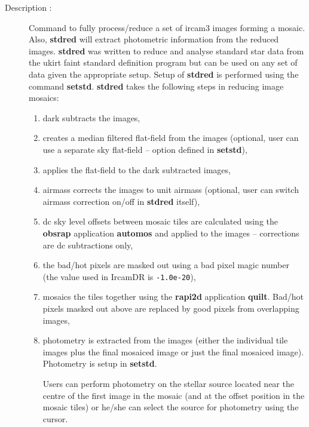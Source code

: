 \begin{description}

\item[Description :] Command to fully process/reduce a set of {\sc
ircam3} images forming a mosaic.  Also, {\bf stdred} will extract
photometric information from the reduced images.  {\bf stdred} was
written to reduce and analyse standard star data from the {\sc ukirt}
faint standard definition program but can be used on any set of data
given the appropriate setup.  Setup of {\bf stdred} is performed using
the command {\bf setstd}.  {\bf stdred} takes the following steps in
reducing image mosaics:

\begin{enumerate}

\item dark subtracts the images,

\item creates a median filtered flat-field from the images
(optional, user can use a separate sky flat-field -- option defined in
{\bf setstd}),

\item applies the flat-field to the dark subtracted images,

\item airmass corrects the images to unit airmass (optional, user
can switch airmass correction on/off in {\bf stdred} itself),

\item dc sky level offsets between mosaic tiles are calculated
using the {\bf obsrap} application {\bf automos} and applied to the
images -- corrections are dc subtractions only,

\item the bad/hot pixels are masked out using a bad pixel magic
number (the value used in {\sc IrcamDR} is {\tt -1.0e-20}),

\item mosaics the tiles together using the {\bf rapi2d}
application {\bf quilt}.  Bad/hot pixels masked out above are replaced
by good pixels from overlapping images,

\item photometry is extracted from the images (either the
individual tile images plus the final mosaiced image or just the final
mosaiced image).  Photometry is setup in {\bf setstd}.

Users can perform photometry on the stellar source located near the
centre of the first image in the mosaic (and at the offset position in
the mosaic tiles) or he/she can select the source for photometry using
the cursor.


\end{enumerate}
\end{description}
